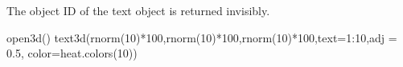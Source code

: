 \begin{Value}
The object ID of the text object is returned invisibly.
\end{Value}
\begin{SeeAlso}\relax
{}
\end{SeeAlso}
\begin{Examples}
\begin{ExampleCode}
open3d()
text3d(rnorm(10)*100,rnorm(10)*100,rnorm(10)*100,text=1:10,adj = 0.5, 
       color=heat.colors(10))
\end{ExampleCode}
\end{Examples}

